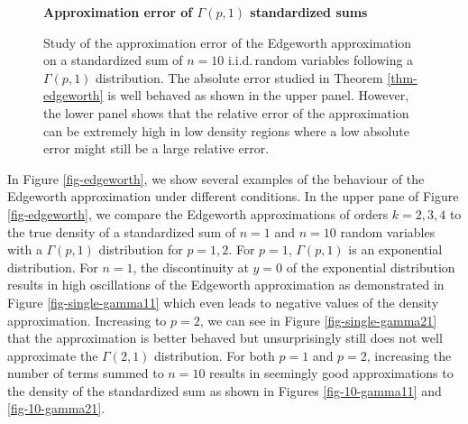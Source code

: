 \begin{example}
    
    \begin{figure}[!htbp]
        \textbf{Approximation error of $\Gamma(p,1)$ standardized sums}
        \centering
        \qquad
        \caption{Study of the approximation error of the Edgeworth approximation on a standardized sum of $n=10$ i.i.d.\,random variables following a $\Gamma(p, 1)$ distribution. The absolute error studied in Theorem \ref{thm-edgeworth} is well behaved as shown in the upper panel. However, the lower panel shows that the relative error of the approximation can be extremely high in low density regions where a low absolute error might still be a large relative error.}
        \label{fig-edgeworth-err}
    \end{figure}
    


    In Figure \ref{fig-edgeworth}, we show several examples of the behaviour of the Edgeworth approximation under different conditions. In the upper pane of Figure \ref{fig-edgeworth}, we compare the Edgeworth approximations of orders $k=2, 3, 4$ to the true density of a standardized sum of $n=1$ and $n=10$ random variables with a $\Gamma(p, 1)$ distribution for $p=1,2$. For $p=1$, $\Gamma(p, 1)$ is an exponential distribution. For $n = 1$, the discontinuity at $y = 0$ of the exponential distribution results in high oscillations of the Edgeworth approximation as demonstrated in Figure \ref{fig-single-gamma11} which even leads to negative values of the density approximation. Increasing to $p = 2$, we can see in Figure \ref{fig-single-gamma21} that the approximation is better behaved but unsurprisingly still does not well approximate the $\Gamma(2, 1)$ distribution. For both $p=1$ and $p=2$, increasing the number of terms summed to $n = 10$ results in seemingly good approximations to the density of the standardized sum as shown in Figures \ref{fig-10-gamma11} and \ref{fig-10-gamma21}.


\end{example}

